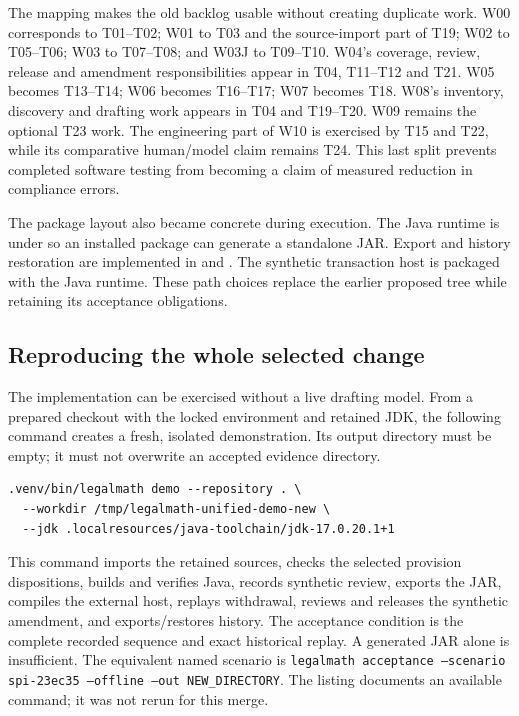 The mapping makes the old backlog usable without creating duplicate work.
W00 corresponds to T01--T02; W01 to T03 and the source-import part of T19;
W02 to T05--T06; W03 to T07--T08; and W03J to T09--T10. W04's coverage,
review, release and amendment responsibilities appear in T04, T11--T12 and
T21. W05 becomes T13--T14; W06 becomes T16--T17; W07 becomes T18.
W08's inventory, discovery and drafting work appears in T04 and T19--T20.
W09 remains the optional T23 work. The engineering part of W10 is exercised
by T15 and T22, while its comparative human/model claim remains T24. This
last split prevents completed software testing from becoming a claim of
measured reduction in compliance errors.

The package layout also became concrete during execution. The Java runtime is
under  so an installed package can generate a
standalone JAR. Export and history restoration are implemented in
 and
. The synthetic transaction host is
packaged with the Java runtime. These path choices replace the earlier proposed
tree while retaining its acceptance obligations.

\subsection{Reproducing the whole selected change}

The implementation can be exercised without a live drafting model. From a
prepared checkout with the locked environment and retained JDK, the following
command creates a fresh, isolated demonstration. Its output directory must be
empty; it must not overwrite an accepted evidence directory.

\begin{lstlisting}[caption={Reproduce the complete local workbench scenario in a new directory.}]
.venv/bin/legalmath demo --repository . \
  --workdir /tmp/legalmath-unified-demo-new \
  --jdk .localresources/java-toolchain/jdk-17.0.20.1+1
\end{lstlisting}

This command imports the retained sources, checks the selected provision
dispositions, builds and verifies Java, records synthetic review, exports the
JAR, compiles the external host, replays withdrawal, reviews and releases the
synthetic amendment, and exports/restores history. The acceptance condition is
the complete recorded sequence and exact historical replay. A generated JAR
alone is insufficient. The equivalent named scenario is
\texttt{legalmath acceptance --scenario spi-23ec35 --offline --out NEW\_DIRECTORY}.
The listing documents an available command; it was not rerun for this merge.

